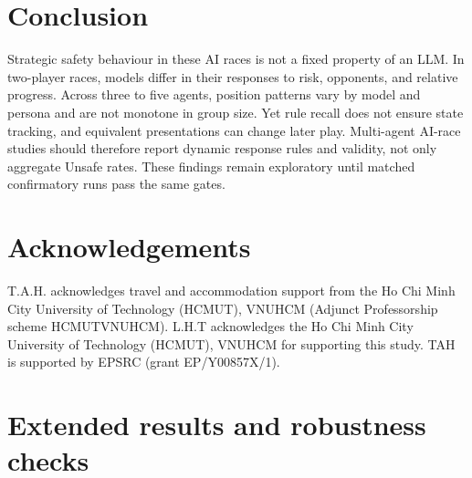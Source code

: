 \documentclass[sigconf]{aamas}
\newcommand{\Safe}{\textsc{safe}}
\newcommand{\Unsafe}{\textsc{unsafe}}
\begin{document}

\section{Conclusion}

Strategic safety behaviour in these AI races is not a fixed property of an LLM.
In two-player races, models differ in their responses to risk, opponents, and
relative progress. Across three to five agents, position patterns vary by model
and persona and are not monotone in group size. Yet rule recall does not ensure
state tracking, and equivalent presentations can change later play. Multi-agent
AI-race studies should therefore report dynamic response rules and validity,
not only aggregate Unsafe rates. These findings remain exploratory until
matched confirmatory runs pass the same gates.

\section*{Acknowledgements}
T.A.H. acknowledges travel and accommodation support from the Ho Chi Minh City University of Technology (HCMUT), VNUHCM (Adjunct Professorship scheme HCMUT\text{-}VNUHCM). L.H.T acknowledges the Ho Chi Minh City University of Technology (HCMUT), VNUHCM for supporting this study.
 TAH is supported by EPSRC (grant EP/Y00857X/1).
 
\appendix
\section{Extended results and robustness checks}
\label{app:extended-results}

\providecommand{\Safe}{\textsc{Safe}}
\providecommand{\Unsafe}{\textsc{Unsafe}}
\providecommand{\todo}[1]{\textbf{[TODO: #1]}}
\end{document}
